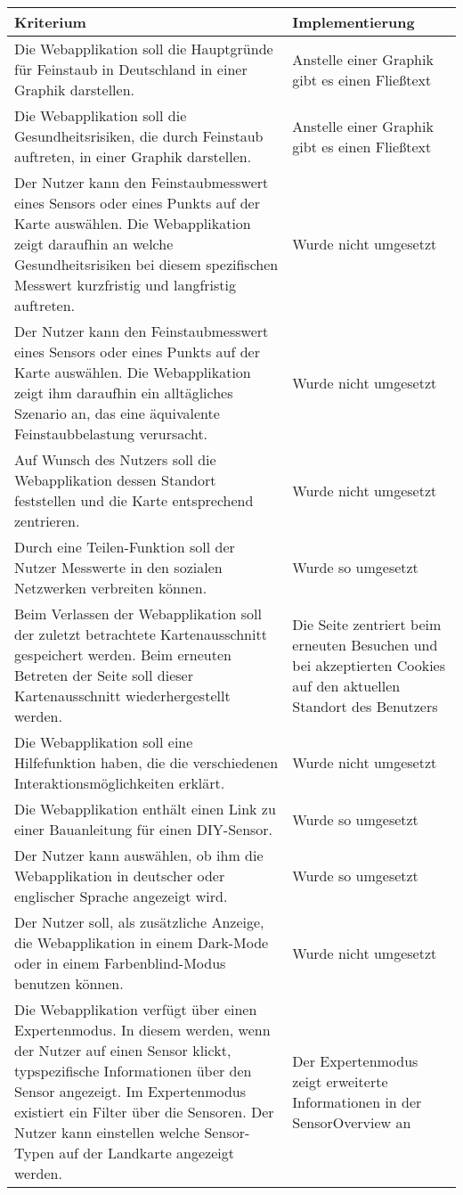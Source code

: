     \begin{tabularx}{\textwidth}{| X | X |}
    \hline
    \textbf{Kriterium} & 
    \textbf{Implementierung}\\
    \hline
    Die Webapplikation soll die Hauptgründe für \gls{Feinstaub} in Deutschland in einer Graphik darstellen. & Anstelle einer Graphik gibt es einen Fließtext \\
    \hline
    Die Webapplikation soll die Gesundheitsrisiken, die durch \gls{Feinstaub} auftreten, in einer Graphik darstellen. & Anstelle einer Graphik gibt es einen Fließtext \\
    \hline
    Der Nutzer kann den \gls{Feinstaub}messwert eines Sensors oder eines Punkts auf der Karte auswählen. 
    Die Webapplikation zeigt daraufhin an welche Gesundheitsrisiken bei diesem spezifischen Messwert kurzfristig und langfristig auftreten. & Wurde nicht umgesetzt \\
    \hline
    Der Nutzer kann den \gls{Feinstaub}messwert eines Sensors oder eines Punkts auf der Karte auswählen. 
    Die Webapplikation zeigt ihm daraufhin ein alltägliches Szenario an, das eine äquivalente \gls{Feinstaub}belastung verursacht. & Wurde nicht umgesetzt \\
    \hline
    Auf Wunsch des Nutzers soll die Webapplikation dessen Standort feststellen und die Karte entsprechend zentrieren. & Wurde nicht umgesetzt \\
    \hline
    Durch eine Teilen-Funktion soll der Nutzer Messwerte in den sozialen Netzwerken verbreiten können. & Wurde so umgesetzt \\
    \hline
    Beim Verlassen der Webapplikation soll der zuletzt betrachtete Kartenausschnitt gespeichert werden. Beim erneuten Betreten der Seite soll dieser Kartenausschnitt wiederhergestellt werden. & Die Seite zentriert beim erneuten Besuchen und bei akzeptierten Cookies auf den aktuellen Standort des Benutzers \\
    \hline
    Die Webapplikation soll eine Hilfefunktion haben, die die verschiedenen Interaktionsmöglichkeiten erklärt. & Wurde nicht umgesetzt \\
    \hline
    Die Webapplikation enthält einen Link zu einer Bauanleitung für einen \gls{DIY}-Sensor. & Wurde so umgesetzt \\
    \hline
    Der Nutzer kann auswählen, ob ihm die Webapplikation in deutscher oder englischer Sprache angezeigt wird. & Wurde so umgesetzt \\
    \hline
    Der Nutzer soll, als zusätzliche Anzeige, die Webapplikation in einem Dark-Mode oder in einem Farbenblind-Modus benutzen können. & Wurde nicht umgesetzt \\
    \hline
    Die Webapplikation verfügt über einen Expertenmodus. In diesem werden, wenn der Nutzer auf einen Sensor klickt, typspezifische Informationen über den Sensor angezeigt.
    Im Expertenmodus existiert ein Filter über die Sensoren. Der Nutzer kann einstellen welche Sensor-Typen auf der Landkarte angezeigt werden. & Der Expertenmodus zeigt erweiterte Informationen in der SensorOverview an\\
    \hline
    \end{tabularx}